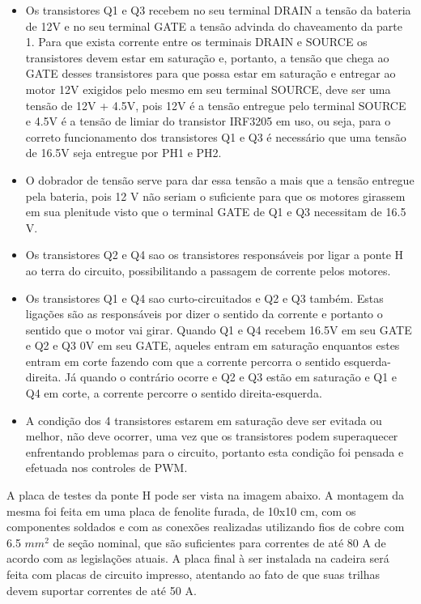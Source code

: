 \begin{itemize}
	\item Os transistores Q1 e Q3 recebem no seu terminal DRAIN a tensão da bateria de 12V e no seu terminal GATE a tensão advinda do chaveamento da parte 1. Para que exista corrente entre os terminais DRAIN e SOURCE os transistores devem estar em saturação e, portanto, a tensão que chega ao GATE desses transistores para que possa estar em saturação e entregar ao motor 12V exigidos pelo mesmo em seu terminal SOURCE, deve ser uma tensão de 12V + 4.5V, pois 12V é a tensão entregue pelo terminal SOURCE e 4.5V é a tensão de limiar do transistor IRF3205 em uso, ou seja, para o correto funcionamento dos transistores Q1 e Q3 é necessário que uma tensão de 16.5V seja entregue por PH1 e PH2.
    \item O dobrador de tensão serve para dar essa tensão a mais que a tensão entregue pela bateria, pois 12 V não seriam o suficiente para que os motores girassem em sua plenitude visto que o terminal GATE de Q1 e Q3 necessitam de 16.5 V.
    \item Os transistores Q2 e Q4 sao os transistores responsáveis por ligar a ponte H ao terra do circuito, possibilitando a passagem de corrente pelos motores.
    \item Os transistores Q1 e Q4 sao curto-circuitados e Q2 e Q3 também. Estas ligações são as responsáveis por dizer o sentido da corrente e portanto o sentido que o motor vai girar. Quando Q1 e Q4 recebem 16.5V em seu GATE e Q2 e Q3 0V em seu GATE, aqueles entram em saturação enquantos estes entram em corte fazendo com que a corrente percorra o sentido esquerda-direita. Já quando o contrário ocorre e Q2 e Q3 estão em saturação e Q1 e Q4 em corte, a corrente percorre o sentido direita-esquerda.
    \item A condição dos 4 transistores estarem em saturação deve ser evitada ou melhor, não deve ocorrer, uma vez que os transistores podem superaquecer enfrentando problemas para o circuito, portanto esta condição foi pensada e efetuada nos controles de PWM.

\end{itemize}

A placa de testes da ponte H pode ser vista na imagem abaixo. A montagem da
mesma foi feita em uma placa de fenolite furada, de 10x10 cm, com os
componentes soldados e com as conexões realizadas utilizando fios de cobre com
6.5 \(mm^2\) de seção nominal, que são suficientes para correntes de até 80 A
de acordo com as legislações atuais. A placa final à ser instalada na cadeira
será feita com placas de circuito impresso, atentando ao fato de que suas
trilhas devem suportar correntes de até 50 A.

